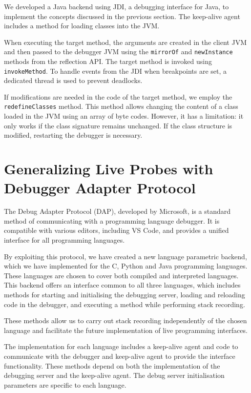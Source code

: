 \documentclass[english,submission]{programming}
\newcommand{\code}[1]{\colorbox{codegray}{\texttt{#1}}}
\begin{document}
We developed a Java backend using JDI, a debugging interface for Java, to implement the concepts discussed in the previous section. 
The keep-alive agent includes a method for loading classes into the JVM.

When executing the target method, the arguments are created in the client JVM and then passed to the debugger JVM using the \code{mirrorOf} and \code{newInstance} methods from the reflection API. 
The target method is invoked using \code{invokeMethod}. 
To handle events from the JDI when breakpoints are set, a dedicated thread is used to prevent deadlocks.

If modifications are needed in the code of the target method, we employ the \code{redefineClasses} method. 
This method allows changing the content of a class loaded in the JVM using an array of byte codes. 
However, it has a limitation: it only works if the class signature remains unchanged. 
If the class structure is modified, restarting the debugger is necessary.

\section{Generalizing Live Probes with Debugger Adapter Protocol}
\label{sec:generalizing-live-probes}
The Debug Adapter Protocol (DAP), developed by Microsoft, is a standard method of communicating with a programming language debugger. It is compatible with various editors, including VS Code, and provides a unified interface for all programming languages. 

By exploiting this protocol, we have created a new language parametric backend, which we have implemented for the C, Python and Java programming languages. These languages are chosen to cover both compiled and interpreted languages. 
This backend offers an interface common to all three languages, which includes methods for starting and initialising the debugging server, loading and reloading code in the debugger, and executing a method while performing stack recording. 

These methods allow us to carry out stack recording independently of the chosen language and facilitate the future implementation of live programming interfaces. 

The implementation for each language includes a keep-alive agent and code to communicate with the debugger and keep-alive agent to provide the interface functionality.
These methods depend on both the implementation of the debugging server and the keep-alive agent. 
The debug server initialisation parameters are specific to each language.
\end{document}
